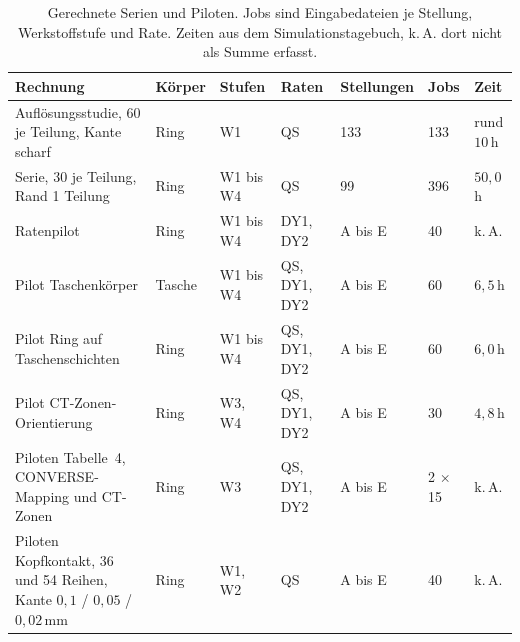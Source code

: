 \begin{table}[htbp]
	\caption{Gerechnete Serien und Piloten. Jobs sind Eingabedateien je Stellung, Werkstoffstufe und Rate. Zeiten aus dem Simulationstagebuch, k.\,A. dort nicht als Summe erfasst.}
	\label{tab:rechenumfang}
	\centering
	\footnotesize
	\begin{tabular}{L{4.0cm}lllL{1.6cm}lL{2.0cm}}
		\hline
		Rechnung                                                                       & Körper & Stufen    & Raten        & Stellungen & Jobs          & Zeit                                       \\
		\hline
		Auflösungsstudie, 60 je Teilung, Kante scharf                                  & Ring   & W1        & QS           & 133        & 133           & rund $10$\,h                               \\
		\hline
		Serie, 30 je Teilung, Rand 1 Teilung                                           & Ring   & W1 bis W4 & QS           & 99         & 396           & $50{,}0$\,h                                \\
		\hline
		Ratenpilot                                                                     & Ring   & W1 bis W4 & DY1, DY2     & A bis E    & 40            & k.\,A.                                     \\
		\hline
		Pilot Taschenkörper                                                            & Tasche & W1 bis W4 & QS, DY1, DY2 & A bis E    & 60            & $6{,}5$\,h                                 \\
		\hline
		Pilot Ring auf Taschenschichten                                                & Ring   & W1 bis W4 & QS, DY1, DY2 & A bis E    & 60            & $6{,}0$\,h                                 \\
		\hline
		Pilot CT-Zonen-Orientierung                                                    & Ring   & W3, W4    & QS, DY1, DY2 & A bis E    & 30            & $4{,}8$\,h                                 \\
		\hline
		Piloten Tabelle~4, CONVERSE-Mapping und CT-Zonen                               & Ring   & W3        & QS, DY1, DY2 & A bis E    & 2 $\times$ 15 & k.\,A.                                     \\
		\hline
		Piloten Kopfkontakt, 36 und 54 Reihen, Kante $0{,}1$ / $0{,}05$ / $0{,}02$\,mm & Ring   & W1, W2    & QS           & A bis E    & 40            & k.\,A.                                     \\
		\hline

\end{tabular}
\end{table}
